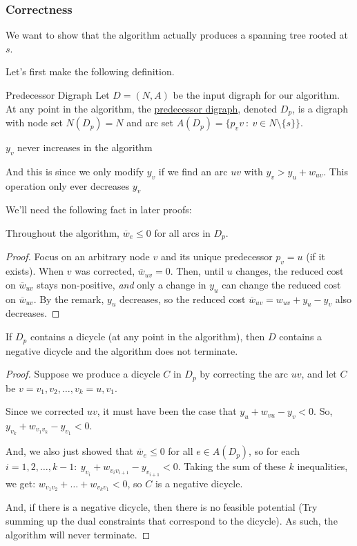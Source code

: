 \subsubsection{Correctness}
We want to show that the algorithm actually produces a spanning tree rooted at $s$.

Let's first make the following definition.
\begin{definition}{Predecessor Digraph}{}
    Let $D = (N,A)$ be the input digraph for our algorithm. At any point in the algorithm, the \underline{predecessor digraph}, denoted $D_p$, is a digraph with node set $N(D_p) = N$ and arc set $A(D_p) = \{p_vv\::\: v\in N\setminus\{s\}\}$.
\end{definition}

\begin{remark}
    $y_v$ never increases in the algorithm
\end{remark}
And this is since we only modify $y_v$ if we find an arc $uv$ with $y_v > y_u + w_{uv}$. This operation only ever decreases $y_v$

We'll need the following fact in later proofs:
\begin{proposition}{}{}
    Throughout the algorithm, $\overline{w}_e \leq 0$ for all arcs in $D_p$.
\end{proposition}
\begin{proof}
    Focus on an arbitrary node $v$ and its unique predecessor $p_v = u$ (if it exists). When $v$ was corrected, $\overline{w}_{uv} = 0$. Then, until $u$ changes, the reduced cost on $\overline{w}_{uv}$ stays non-positive, \textit{and} only a change in $y_u$ can change the reduced cost on $\overline{w}_{uv}$. By the remark, $y_u$ decreases, so the reduced cost $\overline{w}_{uv} = w_{uv} + y_u - y_v$ also decreases.
\end{proof}

\begin{proposition}{}{}
    If $D_p$ contains a dicycle (at any point in the algorithm), then $D$ contains a negative dicycle and the algorithm does not terminate.
\end{proposition}
\begin{proof}
    Suppose we produce a dicycle $C$ in $D_p$ by correcting the arc $uv$, and let $C$ be $v = v_1,v_2,\ldots,v_k = u,v_1$.

    Since we corrected $uv$, it must have been the case that $y_u + w_{vu} - y_v < 0$. So, $y_{v_k} + w_{v_1v_k} - y_{v_1} < 0$.

    And, we also just showed that $\overline{w}_e \leq 0$ for all $e \in A(D_p)$, so for each $i = 1, 2, \ldots, k -1: \: y_{v_i} + w_{v_iv_{i+1}} - y_{v_{i+1}} < 0$. Taking the sum of these $k$ inequalities, we get:
    $w_{v_1v_2} + \ldots + w_{v_kv_1} < 0$, so $C$ is a negative dicycle.

    And, if there is a negative dicycle, then there is no feasible potential (Try summing up the dual constraints that correspond to the dicycle). As such, the algorithm will never terminate.
\end{proof}

